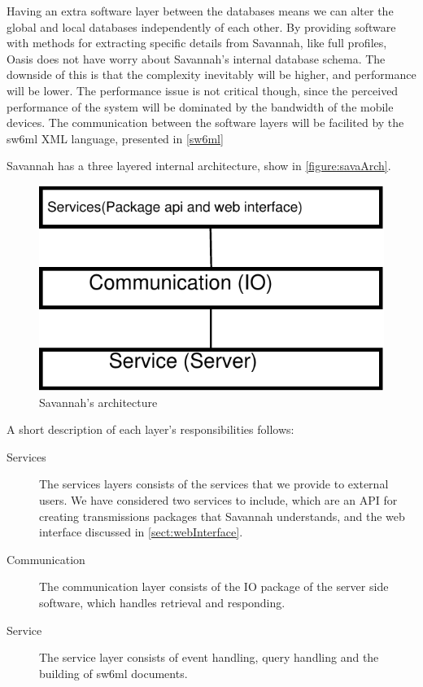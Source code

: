 Having an extra software layer between the databases means we can alter the global and local databases independently of each other. By providing software with methods for extracting specific
details from Savannah, like full profiles, Oasis does not have worry about Savannah's internal database schema. The downside of this is that the complexity inevitably will be higher, and performance
will be lower. The performance issue is not critical though, since the perceived performance of the system will be dominated by the bandwidth of the mobile devices. 
The communication between the software layers will be facilited by the sw6ml XML language, presented in \autoref{sw6ml}

Savannah has a three layered internal architecture, show in \autoref{figure:savaArch}.

\begin{figure}[H]
  \centering
    \includegraphics{images/savaArch}
  \caption{Savannah's architecture}
  \label{figure:savaArch}
\end{figure}

A short description of each layer's responsibilities follows:

\begin{description}
 \item[Services] The services layers consists of the services that we provide to external users. We have considered two services to include, which are an API for creating transmissions packages	 		that Savannah understands, and the web interface discussed in \autoref{sect:webInterface}.
 \item[Communication] The communication layer consists of the IO package of the server side software, which handles retrieval and responding.
 \item[Service] The service layer consists of event handling, query handling and the building of sw6ml documents.
\end{description}


